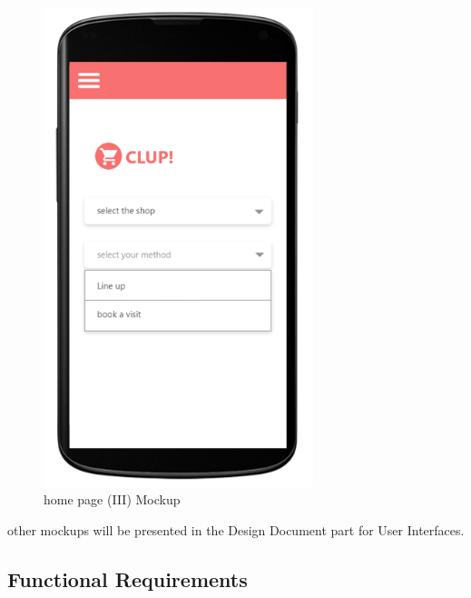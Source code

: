 \begin{figure}[H]
  \centering
  \includegraphics[width=0.7\textwidth,keepaspectratio]{images/11.png}
  \caption{home page (III) Mockup}
\end{figure}
other mockups will be presented in the Design Document part for User Interfaces.

\subsection{Functional Requirements}



